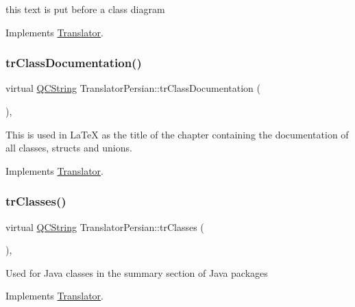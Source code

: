 this text is put before a class diagram 

Implements \mbox{\hyperlink{class_translator}{Translator}}.

\mbox{\label{class_translator_persian_aaaff17a573c5bc855698a4015590b7f4}} 
\subsubsection{\texorpdfstring{trClassDocumentation()}{trClassDocumentation()}}
{\footnotesize\ttfamily virtual \mbox{\hyperlink{class_q_c_string}{Q\+C\+String}} Translator\+Persian\+::tr\+Class\+Documentation (\begin{DoxyParamCaption}{ }\end{DoxyParamCaption})\hspace{0.3cm}{\ttfamily [inline]}, {\ttfamily [virtual]}}

This is used in La\+TeX as the title of the chapter containing the documentation of all classes, structs and unions. 

Implements \mbox{\hyperlink{class_translator}{Translator}}.

\mbox{\label{class_translator_persian_a41e5c2860a2f73546b9ce407472bac14}} 
\subsubsection{\texorpdfstring{trClasses()}{trClasses()}}
{\footnotesize\ttfamily virtual \mbox{\hyperlink{class_q_c_string}{Q\+C\+String}} Translator\+Persian\+::tr\+Classes (\begin{DoxyParamCaption}{ }\end{DoxyParamCaption})\hspace{0.3cm}{\ttfamily [inline]}, {\ttfamily [virtual]}}

Used for Java classes in the summary section of Java packages 

Implements \mbox{\hyperlink{class_translator}{Translator}}.

\mbox{\label{class_translator_persian_abca5368d720066258cfe9c67badeba50}} 
